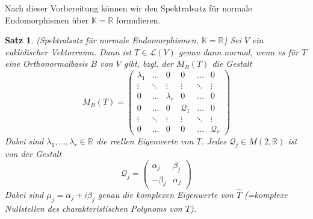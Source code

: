 \documentclass[12pt,a4paper]{article}
\newtheorem{theorem}{Satz}
\theoremstyle{definition}
\theoremstyle{remark}
\renewcommand{\hat}[1]{\widehat{#1}}
\begin{document}
	Nach dieser Vorbereitung können wir den Spektralsatz für normale Endomorphismen über $\mathbb{K} = \mathbb{R}$ formulieren. 
	\newpage
	\begin{theorem}{(Spektralsatz für normale Endomorphismen,  $\mathbb{K} = \mathbb{R}$)}
		Sei $V$ ein euklidischer Vektorraum. Dann ist $T \in \mathcal{L}(V)$ genau dann normal, wenn es für $T$ eine Orthonormalbasis $B$ von $V$ gibt, bzgl. der $M_B(T)$ die Gestalt \\
		\begin{equation}
			M_B(T) =
			\begin{pmatrix}
				\lambda_1 & \dots & 0 &0 & \dots & 0 \\
				\vdots &\ddots & \vdots & \vdots & \ddots& \vdots\\
				0 & \dots & \lambda_r & 0 &\dots & 0 \\
				0 & \dots & 0 & \mathcal{Q}_1 & \dots & 0 \\
				\vdots & \ddots & \vdots & \vdots & \ddots & \vdots \\
				0 & \dots & 0 & 0 & \dots & \mathcal{Q}_r
			\end{pmatrix}	
		\end{equation}
		Dabei sind $\lambda_1,...,\lambda_r \in \mathbb{R}$ die reellen Eigenwerte von $T$. Jedes $\mathcal{Q}_j \in M(2,\mathbb{R})$ ist von der Gestalt
		\begin{equation}
			\mathcal{Q}_j = 
			\begin{pmatrix}
				\alpha_j & \beta_j \\
				- \beta_j & \alpha_j
			\end{pmatrix}
		\end{equation}
		Dabei sind $\mu_j = \alpha_j + i\beta_j $ genau die komplexen Eigenwerte von $\hat{T}$ (=komplexe Nullstellen des charakteristischen Polynoms von $T$).
	\end{theorem}
\end{document}
